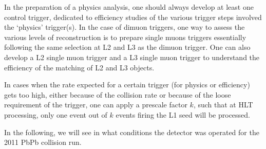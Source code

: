 In the preparation of a physics analysis, one should always develop at
least one control trigger, dedicated to efficiency studies of the
various trigger steps involved the `physics' trigger(s). In the case
of dimuon triggers, one way to assess the various levels of
reconstruction is to prepare single muons triggers essentially
following the same selection at L2 and L3 as the dimuon trigger. One
can also develop a L2 single muon trigger and a L3 single muon trigger
to understand the efficiency of the matching of L2 and L3 objects.


In cases when the rate expected for a certain trigger (for physics or
efficiency) gets too high, either because of the collision rate or
because of the loose requirement of the trigger, one can apply a
prescale factor $k$, such that at HLT processing, only one event out
of $k$ events firing the L1 seed will be processed. 

In the following, we will see in what conditions the detector was
operated for the 2011 PbPb collision run.















